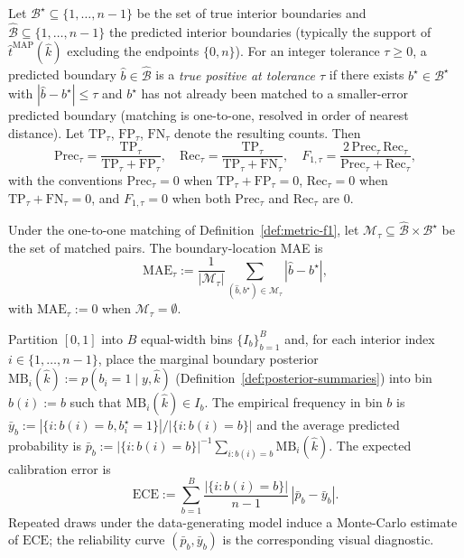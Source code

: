 \begin{definition}
\label{def:metric-f1}
Let $\mathcal{B}^\star\subseteq\{1,\dots,n-1\}$ be the set of true interior boundaries and
$\widehat{\mathcal{B}}\subseteq\{1,\dots,n-1\}$ the predicted interior boundaries (typically the
support of $\widehat t^{\mathrm{MAP}}(\widehat k)$ excluding the endpoints $\{0,n\}$). For an
integer tolerance $\tau\ge 0$, a predicted boundary $\hat b\in\widehat{\mathcal{B}}$ is a
\emph{true positive at tolerance $\tau$} if there exists $b^\star\in\mathcal{B}^\star$ with
$|\hat b-b^\star|\le\tau$ and $b^\star$ has not already been matched to a smaller-error predicted
boundary (matching is one-to-one, resolved in order of nearest distance). Let
$\mathrm{TP}_\tau$, $\mathrm{FP}_\tau$, $\mathrm{FN}_\tau$ denote the resulting counts. Then
\[
\mathrm{Prec}_\tau=\frac{\mathrm{TP}_\tau}{\mathrm{TP}_\tau+\mathrm{FP}_\tau},\quad
\mathrm{Rec}_\tau=\frac{\mathrm{TP}_\tau}{\mathrm{TP}_\tau+\mathrm{FN}_\tau},\quad
F_{1,\tau}=\frac{2\,\mathrm{Prec}_\tau\,\mathrm{Rec}_\tau}{\mathrm{Prec}_\tau+\mathrm{Rec}_\tau},
\]
with the conventions $\mathrm{Prec}_\tau=0$ when $\mathrm{TP}_\tau+\mathrm{FP}_\tau=0$,
$\mathrm{Rec}_\tau=0$ when $\mathrm{TP}_\tau+\mathrm{FN}_\tau=0$, and $F_{1,\tau}=0$ when both
$\mathrm{Prec}_\tau$ and $\mathrm{Rec}_\tau$ are $0$.
\end{definition}

\begin{definition}
\label{def:metric-mae}
Under the one-to-one matching of Definition~\ref{def:metric-f1}, let
$\mathcal{M}_\tau\subseteq\widehat{\mathcal{B}}\times\mathcal{B}^\star$ be the set of matched
pairs. The boundary-location MAE is
\[
\mathrm{MAE}_\tau:=\frac{1}{|\mathcal{M}_\tau|}\sum_{(\hat b,b^\star)\in\mathcal{M}_\tau}|\hat b-b^\star|,
\]
with $\mathrm{MAE}_\tau:=0$ when $\mathcal{M}_\tau=\emptyset$.
\end{definition}

\begin{definition}
\label{def:metric-ece}
Partition $[0,1]$ into $B$ equal-width bins $\{I_b\}_{b=1}^B$ and, for each interior index
$i\in\{1,\dots,n-1\}$, place the marginal boundary posterior
$\mathrm{MB}_i(\widehat k):=p(b_i=1\mid y,\widehat k)$
(Definition~\ref{def:posterior-summaries}) into bin $b(i):=b$ such that
$\mathrm{MB}_i(\widehat k)\in I_b$. The empirical frequency in bin $b$ is
$\bar y_b:=|\{i:b(i)=b, b_i^\star=1\}|/|\{i:b(i)=b\}|$ and the average predicted probability is
$\bar p_b:=|\{i:b(i)=b\}|^{-1}\sum_{i:b(i)=b}\mathrm{MB}_i(\widehat k)$.
The expected calibration error is
\[
\mathrm{ECE}:=\sum_{b=1}^B \frac{|\{i:b(i)=b\}|}{n-1}\,|\bar p_b-\bar y_b|.
\]
Repeated draws under the data-generating model induce a Monte-Carlo estimate of $\mathrm{ECE}$;
the reliability curve $(\bar p_b,\bar y_b)$ is the corresponding visual diagnostic.
\end{definition}

